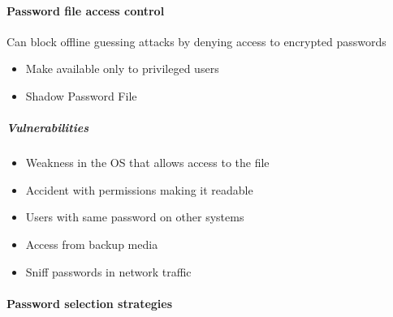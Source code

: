 \documentclass{article}
\begin{document}
            \paragraph{Password file
            access control}
                    Can block offline guessing attacks by denying access to
                    encrypted passwords
                    \begin{itemize}
                        \item Make available only to privileged users
                        \item Shadow Password File
                    \end{itemize}

                    \subparagraph{Vulnerabilities}
                    \begin{itemize}
                        \item Weakness in the OS that allows access to the file
                        \item Accident with permissions making it readable
                        \item Users with same password on other systems
                        \item Access from backup media
                        \item Sniff passwords in network traffic
                    \end{itemize}
            \paragraph{Password selection strategies}
                    
\end{document}

